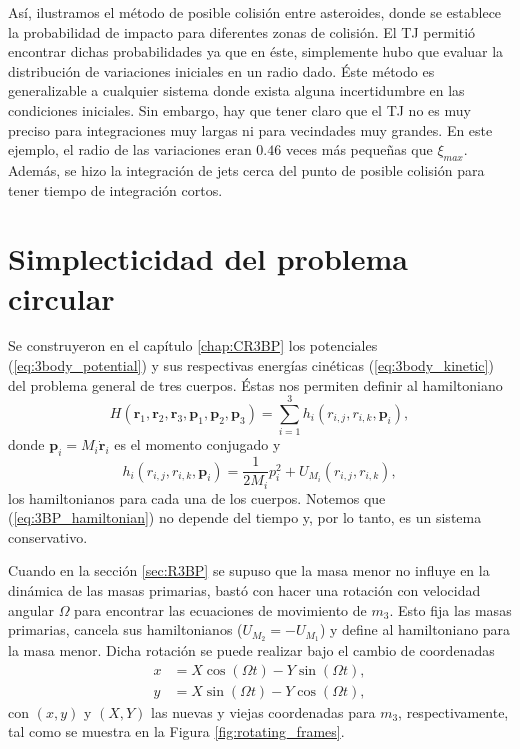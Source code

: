 Así, ilustramos el método de posible colisión entre asteroides, donde se establece la probabilidad de impacto para diferentes zonas de colisión. El TJ permitió encontrar dichas probabilidades ya que en éste, simplemente hubo que evaluar la distribución de variaciones iniciales en un radio dado. Éste método es generalizable a cualquier sistema donde exista alguna incertidumbre en las condiciones iniciales. Sin embargo, hay que tener claro que el TJ no es muy preciso para integraciones muy largas ni para vecindades muy grandes. En este ejemplo, el radio de las variaciones eran $0.46$ veces más pequeñas que $\xi_{max}$. Además, se hizo la integración de jets cerca del punto de posible colisión para tener tiempo de integración cortos. 


\section{Simplecticidad del problema circular}
\label{sec:C3BP_simplecticity}

Se construyeron en el capítulo \ref{chap:CR3BP} los potenciales (\ref{eq:3body_potential}) y sus respectivas energías cinéticas (\ref{eq:3body_kinetic}) del problema general de tres cuerpos. Éstas nos permiten definir al hamiltoniano
\begin{equation}
 H(\mathbf{r}_1, \mathbf{r}_2, \mathbf{r}_3, \mathbf{p}_1, \mathbf{p}_2, \mathbf{p}_3) = \sum_{i=1}^3 h_i(r_{i,j}, r_{i,k}, \mathbf{p}_i),
 \label{eq:3BP_hamiltonian}
\end{equation} 
donde $\mathbf{p}_i = M_i \dot{\mathbf{r}}_i$ es el momento conjugado y
\begin{equation}
 h_i(r_{i,j}, r_{i,k}, \mathbf{p}_i) = \frac{1}{2 M_i} p_i^2 + U_{M_i}(r_{i,j}, r_{i,k}),
 \label{eq:individual_hamiltonian}
\end{equation}
los hamiltonianos para cada una de los cuerpos. Notemos que (\ref{eq:3BP_hamiltonian}) no depende del tiempo y, por lo tanto, es un sistema conservativo. 

Cuando en la sección \ref{sec:R3BP} se supuso que la masa menor no influye en la dinámica de las masas primarias, bastó con hacer una rotación con velocidad angular $\Omega$ para encontrar las ecuaciones de movimiento de $m_3$. Esto fija las masas primarias, cancela sus hamiltonianos ($  U_{M_2} = - U_{M_1}$) y define al hamiltoniano para la masa menor. Dicha rotación se puede realizar bajo el cambio de coordenadas
\begin{align*}
 x &= X\cos (\Omega t) - Y \sin (\Omega t), \\
 y &= X\sin (\Omega t) - Y \cos (\Omega t), 
\end{align*} 
con $(x,y)$ y $(X,Y)$ las nuevas y viejas coordenadas para $m_3$, respectivamente, tal como se muestra en la Figura \ref{fig:rotating_frames}.

